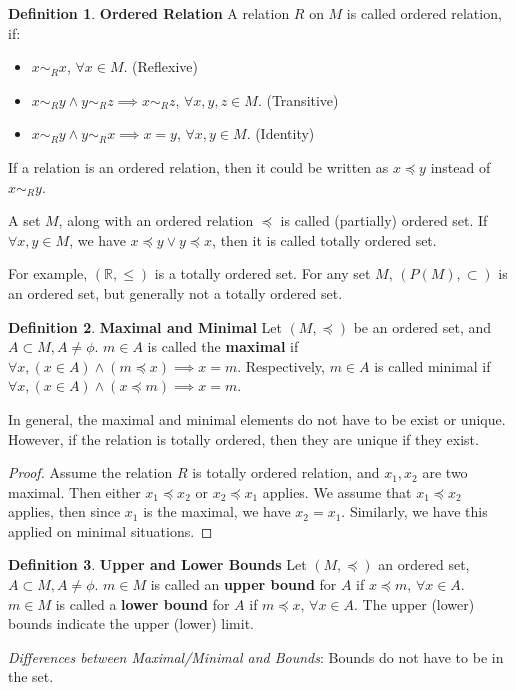 \documentclass{article}
\theoremstyle{definition}
\newtheorem{defi}{Definition}[subsection]
\begin{document}
\begin{defi}
\textbf{Ordered Relation} A relation $R$ on $M$ is called ordered relation, if: 
\begin{itemize}
    \item $x \sim_{R} x$, $\forall x \in M$. (Reflexive)
    \item $x \sim_{R} y \land y \sim_{R} z \implies x \sim_{R} z$, $\forall x, y, z \in M$. (Transitive)
    \item $x \sim_{R} y \land y \sim_{R} x \implies x = y$, $\forall x, y \in M$. (Identity)
\end{itemize}

If a relation is an ordered relation, then it could be written as $x \preceq y$ instead of $x \sim_{R} y$.

A set $M$, along with an ordered relation $\preceq$ is called (partially) ordered set. If $\forall x,y \in M$, we have $x \preceq y \lor y \preceq x$, then it is called totally ordered set.

For example, $(\mathbb{R},\leq)$ is a totally ordered set. For any set $M$, $(P(M), \subset)$ is an ordered set, but generally not a totally ordered set.

\end{defi}

\begin{defi}
\textbf{Maximal and Minimal} Let $(M, \preceq)$ be an ordered set, and $A \subset M, A \neq \phi$. $m\in A$ is called the \textbf{maximal} if $\forall x, (x \in A)\land(m\preceq x) \implies x = m$. Respectively, $m\in A$ is called minimal if $\forall x, (x \in A)\land(x\preceq m) \implies x = m$.

In general, the maximal and minimal elements do not have to be exist or unique. However, if the relation is totally ordered, then they are unique if they exist.

\begin{proof}

Assume the relation $R$ is totally ordered relation, and $x_1, x_2$ are two maximal. Then either $x_{1} \preceq x_{2}$ or $x_{2} \preceq x_{1}$ applies. We assume that $x_{1} \preceq x_{2}$ applies, then since $x_{1}$ is the maximal, we have $x_{2}=x_{1}$. Similarly, we have this applied on minimal situations. 
\end{proof}
\end{defi}

\begin{defi}
\textbf{Upper and Lower Bounds} Let $(M, \preceq)$ an ordered set, $A \subset M, A \neq \phi$. $m \in M$ is called an \textbf{upper bound} for $A$ if $x \preceq m$, $\forall x\in A$. $m \in M$ is called a \textbf{lower bound} for $A$ if $m \preceq x$, $\forall x \in A$. The upper (lower) bounds indicate the upper (lower) limit.

\textit{Differences between Maximal/Minimal and Bounds}: Bounds do not have to be in the set.

\end{defi}
\end{document}
